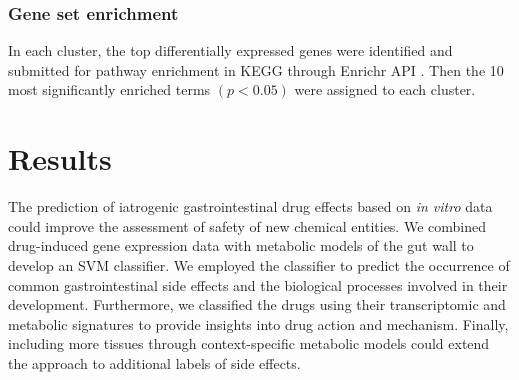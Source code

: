 \subsubsection{Gene set enrichment}
In each cluster, the top differentially expressed genes were identified and submitted for pathway enrichment in KEGG \cite{kanehisa2017kegg} through Enrichr API \cite{kuleshov2016enrichr,chen2013enrichr}. Then the 10 most significantly enriched terms $(p<0.05)$ were assigned to each cluster.
\section{Results}
The prediction of iatrogenic gastrointestinal drug effects based on \textit{in vitro} data could improve the assessment of safety of new chemical entities. We combined drug-induced gene expression data with metabolic models of the gut wall to develop an SVM classifier. We employed the classifier to predict the occurrence of common gastrointestinal side effects and the biological processes involved in their development. Furthermore, we classified the drugs using their transcriptomic and metabolic signatures to provide insights into drug action and mechanism. Finally, including more tissues through context-specific metabolic models could extend the approach to additional labels of side effects.
